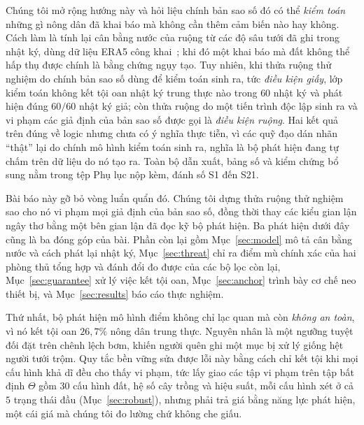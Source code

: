 Chúng tôi mở rộng hướng này và hỏi liệu chính bản sao số đó có thể \emph{kiểm toán}
những gì nông dân đã khai báo mà không cần thêm cảm biến nào hay không. Cách làm là tính
lại cân bằng nước của ruộng từ các độ sâu tưới đã ghi trong nhật ký, dùng dữ liệu ERA5
công khai~\cite{hersbach2020}; khi đó một khai báo mà đất không thể hấp thụ được chính là
bằng chứng ngụy tạo. Tuy nhiên, khi thửa ruộng thử nghiệm do chính bản sao số dùng để
kiểm toán sinh ra, tức \emph{điều kiện giấy}, lớp kiểm toán không kết tội oan nhật ký
trung thực nào trong $60$ nhật ký và phát hiện đúng $60/60$ nhật ký giả; còn thửa ruộng
do một tiến trình độc lập sinh ra và vi phạm các giả định của bản sao số được gọi là
\emph{điều kiện ruộng}. Hai kết quả trên đúng về logic nhưng chưa có ý nghĩa thực tiễn,
vì các quỹ đạo dán nhãn ``thật'' lại do chính mô hình kiểm toán sinh ra, nghĩa là bộ phát
hiện đang tự chấm trên dữ liệu do nó tạo ra. Toàn bộ dẫn xuất, bảng số và kiểm chứng bổ
sung nằm trong tệp Phụ lục nộp kèm, đánh số S1 đến S21.

Bài báo này gỡ bỏ vòng luẩn quẩn đó. Chúng tôi dựng thửa ruộng thử nghiệm sao cho nó vi
phạm mọi giả định của bản sao số, đồng thời thay các kiểu gian lận ngây thơ bằng một bên gian lận đã đọc kỹ bộ phát hiện. Ba phát hiện dưới đây cũng là ba đóng góp của bài. Phần còn
lại gồm Mục~\ref{sec:model} mô tả cân bằng nước và cách phát lại nhật ký,
Mục~\ref{sec:threat} chỉ ra điểm mù chính xác của hai phòng thủ tổng hợp và đánh đổi đo được của các bộ lọc còn lại,
Mục~\ref{sec:guarantee} xử lý việc kết tội oan, Mục~\ref{sec:anchor} trình bày cơ chế neo
thiết bị, và Mục~\ref{sec:results} báo cáo thực nghiệm.

Thứ nhất, bộ phát hiện mô hình điểm không chỉ lạc quan mà còn \emph{không an toàn}, vì nó
kết tội oan $26{,}7\%$ nông dân trung thực. Nguyên nhân là một ngưỡng tuyệt đối đặt trên
chênh lệch bơm, khiến người quên ghi một mục bị xử lý giống hệt người tưới trộm. Quy tắc
bền vững sửa được lỗi này bằng cách chỉ kết tội khi mọi cấu hình khả dĩ đều cho thấy vi
phạm, tức lấy giao các tập vi phạm trên tập bất định $\Theta$ gồm $30$ cấu hình đất, hệ số
cây trồng và hiệu suất, mỗi cấu hình xét ở cả $5$ trạng thái đầu (Mục~\ref{sec:robust}),
nhưng phải trả giá bằng năng lực phát hiện, một cái giá mà chúng tôi đo lường chứ không
che giấu.

